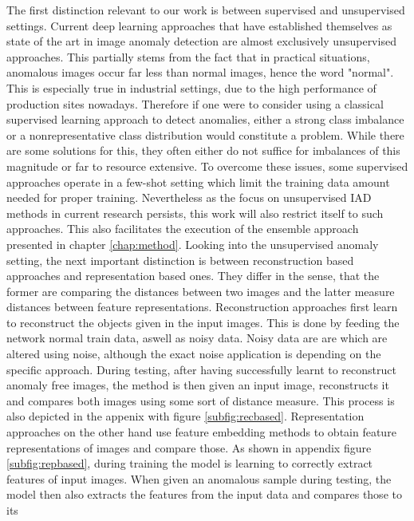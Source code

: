 The first distinction relevant to our work is between supervised and unsupervised settings. Current deep learning approaches that have established themselves as state of the art in image anomaly detection 
are almost exclusively unsupervised approaches. This partially stems from the fact 
that in practical situations, anomalous images occur far less than normal images, hence the word "normal". This is especially true in industrial settings, due to the high performance of 
production sites nowadays. Therefore if one were to consider using a classical supervised learning approach to detect anomalies, either a strong class imbalance or a nonrepresentative class 
distribution would constitute a problem. While there are some solutions for this, they often either do not suffice for imbalances of this magnitude or far to resource extensive. To overcome 
these issues, some supervised approaches \cite{Chu_2020supervised} operate in a few-shot setting which limit the training data amount needed for proper training. Nevertheless as the focus on 
unsupervised IAD methods in current research persists, 
this work will also restrict itself to such approaches. This also facilitates the execution of the ensemble approach presented in chapter \ref{chap:method}.
\newline
Looking into the unsupervised anomaly setting, the next important distinction is between reconstruction based approaches and representation based ones. They differ in the sense, that the former 
are comparing the distances between two images and the latter measure distances between feature representations.
Reconstruction approaches first learn to reconstruct the objects given in the input images. This is done by feeding the network normal train data, aswell as noisy data. Noisy data are are 
which are altered using noise, although the exact noise application is depending on the specific approach. During testing, after having successfully learnt to 
reconstruct anomaly free images, the method is then given an input image, reconstructs it and compares both images using some sort of distance measure. This process is also depicted in the appenix with figure \ref{subfig:recbased}. 
Representation approaches on the other hand use feature embedding methods to obtain feature representations of images and compare those. As shown in appendix figure \ref{subfig:repbased}, during training the model is 
learning to correctly extract features of input images. When given an anomalous sample during testing, the model then also extracts the features from the input data and compares those to its 
